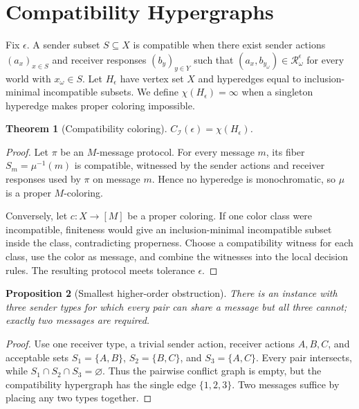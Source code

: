 \documentclass[letterpaper,10pt]{article}
\newtheorem{theorem}{Theorem}
\newtheorem{proposition}[theorem]{Proposition}
\newcommand{\Rset}{\mathcal{R}}
\newcommand{\I}{\mathcal{I}}
\begin{document}
\section{Compatibility Hypergraphs}

Fix $\epsilon$. A sender subset $S\subseteq X$ is compatible when there exist
sender actions $(a_x)_{x\in S}$ and receiver responses $(b_y)_{y\in Y}$ such
that $(a_x,b_{y_\omega})\in\Rset_\omega^\epsilon$ for every world with
$x_\omega\in S$. Let $H_\epsilon$ have vertex set $X$ and hyperedges equal to
inclusion-minimal incompatible subsets. We define $\chi(H_\epsilon)=\infty$
when a singleton hyperedge makes proper coloring impossible.

\begin{theorem}[Compatibility coloring]\label{thm:compatibility}
$C_\I(\epsilon)=\chi(H_\epsilon)$.
\end{theorem}
\begin{proof}
Let $\pi$ be an $M$-message protocol. For every message $m$, its fiber
$S_m=\mu^{-1}(m)$ is compatible, witnessed by the sender actions and receiver
responses used by $\pi$ on message $m$. Hence no hyperedge is monochromatic,
so $\mu$ is a proper $M$-coloring.

Conversely, let $c:X\to[M]$ be a proper coloring. If one color class were
incompatible, finiteness would give an inclusion-minimal incompatible subset
inside the class, contradicting properness. Choose a compatibility witness for
each class, use the color as message, and combine the witnesses into the local
decision rules. The resulting protocol meets tolerance $\epsilon$.
\end{proof}

\begin{proposition}[Smallest higher-order obstruction]
There is an instance with three sender types for which every pair can share a
message but all three cannot; exactly two messages are required.
\end{proposition}
\begin{proof}
Use one receiver type, a trivial sender action, receiver actions $A,B,C$, and
acceptable sets $S_1=\{A,B\}$, $S_2=\{B,C\}$, and $S_3=\{A,C\}$. Every pair
intersects, while $S_1\cap S_2\cap S_3=\varnothing$. Thus the pairwise conflict
graph is empty, but the compatibility hypergraph has the single edge
$\{1,2,3\}$. Two messages suffice by placing any two types together.
\end{proof}
\end{document}
